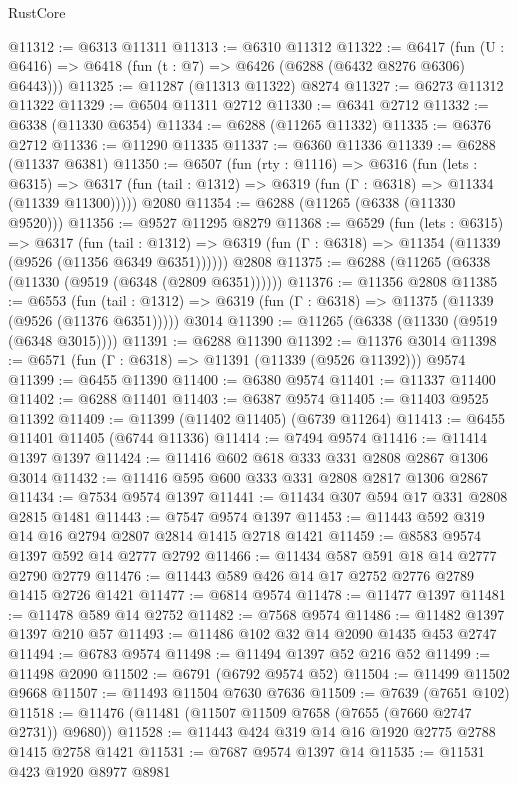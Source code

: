 \begin{lexlean}{RustCore}
\begin{coremodule}
@11312 := @6313 @11311
@11313 := @6310 @11312
@11322 := @6417 (fun (U : @6416) => @6418 (fun (t : @7) => @6426 (@6288 (@6432 @8276 @6306) @6443)))
@11325 := @11287 (@11313 @11322) @8274
@11327 := @6273 @11312 @11322
@11329 := @6504 @11311 @2712
@11330 := @6341 @2712
@11332 := @6338 (@11330 @6354)
@11334 := @6288 (@11265 @11332)
@11335 := @6376 @2712
@11336 := @11290 @11335
@11337 := @6360 @11336
@11339 := @6288 (@11337 @6381)
@11350 := @6507
    (fun (rty : @1116) =>
    @6316
      (fun (lets : @6315) =>
      @6317 (fun (tail : @1312) => @6319 (fun (Γ : @6318) => @11334 (@11339 @11300)))))
    @2080
@11354 := @6288 (@11265 (@6338 (@11330 @9520)))
@11356 := @9527 @11295 @8279
@11368 := @6529
    (fun (lets : @6315) =>
    @6317
      (fun (tail : @1312) =>
      @6319 (fun (Γ : @6318) => @11354 (@11339 (@9526 (@11356 @6349 @6351))))))
    @2808
@11375 := @6288 (@11265 (@6338 (@11330 (@9519 (@6348 (@2809 @6351))))))
@11376 := @11356 @2808
@11385 := @6553
    (fun (tail : @1312) => @6319 (fun (Γ : @6318) => @11375 (@11339 (@9526 (@11376 @6351)))))
    @3014
@11390 := @11265 (@6338 (@11330 (@9519 (@6348 @3015))))
@11391 := @6288 @11390
@11392 := @11376 @3014
@11398 := @6571 (fun (Γ : @6318) => @11391 (@11339 (@9526 @11392))) @9574
@11399 := @6455 @11390
@11400 := @6380 @9574
@11401 := @11337 @11400
@11402 := @6288 @11401
@11403 := @6387 @9574
@11405 := @11403 @9525 @11392
@11409 := @11399 (@11402 @11405) (@6739 @11264)
@11413 := @6455 @11401 @11405 (@6744 @11336)
@11414 := @7494 @9574
@11416 := @11414 @1397 @1397
@11424 := @11416 @602 @618 @333 @331 @2808 @2867 @1306 @3014
@11432 := @11416 @595 @600 @333 @331 @2808 @2817 @1306 @2867
@11434 := @7534 @9574 @1397
@11441 := @11434 @307 @594 @17 @331 @2808 @2815 @1481
@11443 := @7547 @9574 @1397
@11453 := @11443 @592 @319 @14 @16 @2794 @2807 @2814 @1415 @2718 @1421
@11459 := @8583 @9574 @1397 @592 @14 @2777 @2792
@11466 := @11434 @587 @591 @18 @14 @2777 @2790 @2779
@11476 := @11443 @589 @426 @14 @17 @2752 @2776 @2789 @1415 @2726 @1421
@11477 := @6814 @9574
@11478 := @11477 @1397
@11481 := @11478 @589 @14 @2752
@11482 := @7568 @9574
@11486 := @11482 @1397 @1397 @210 @57
@11493 := @11486 @102 @32 @14 @2090 @1435 @453 @2747
@11494 := @6783 @9574
@11498 := @11494 @1397 @52 @216 @52
@11499 := @11498 @2090
@11502 := @6791 (@6792 @9574 @52)
@11504 := @11499 @11502 @9668
@11507 := @11493 @11504 @7630 @7636
@11509 := @7639 (@7651 @102)
@11518 := @11476 (@11481 (@11507 @11509 @7658 (@7655 (@7660 @2747 @2731)) @9680))
@11528 := @11443 @424 @319 @14 @16 @1920 @2775 @2788 @1415 @2758 @1421
@11531 := @7687 @9574 @1397 @14
@11535 := @11531 @423 @1920 @8977 @8981

\end{coremodule}
\end{lexlean}

